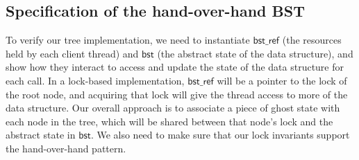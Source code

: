 \documentclass[acmsmall,screen]{acmart}\settopmatter{printfolios=true}
\newcommand{\treerep}{\ensuremath{\mathsf{bst}}}
\newcommand{\nodeboxrep}{\ensuremath{\mathsf{bst\_ref}}}
\begin{document}
\subsection{Specification of the hand-over-hand BST}

To verify our tree implementation, we need to instantiate $\nodeboxrep$ (the resources held by each client thread) and $\treerep$ (the abstract state of the data structure), and show how they interact to access and update the state of the data structure for each call. In a lock-based implementation, $\nodeboxrep$ will be a pointer to the lock of the root node, and acquiring that lock will give the thread access to more of the data structure. Our overall approach is to associate a piece of ghost state with each node in the tree, which will be shared between that node's lock and the abstract state in $\treerep$. We also need to make sure that our lock invariants support the hand-over-hand pattern.
\end{document}
